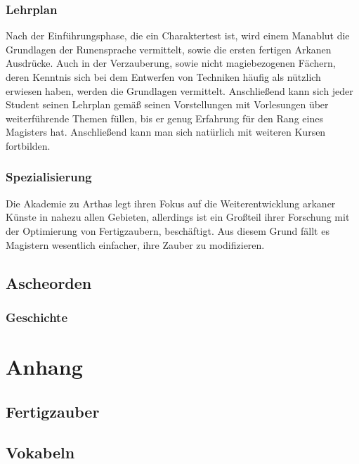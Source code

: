 \documentclass[a4paper,12pt,oneside]{book}
\begin{document}
\section{Lehrplan}
Nach der Einführungsphase, die ein Charaktertest ist, wird einem Manablut die Grundlagen der Runensprache vermittelt, sowie die ersten fertigen Arkanen Ausdrücke. Auch in der Verzauberung, sowie nicht magiebezogenen Fächern, deren Kenntnis sich bei dem Entwerfen von Techniken häufig als nützlich erwiesen haben, werden die Grundlagen vermittelt. Anschließend kann sich jeder Student seinen Lehrplan gemäß seinen Vorstellungen mit Vorlesungen über weiterführende Themen füllen, bis er genug Erfahrung für den Rang eines Magisters hat. Anschließend kann man sich natürlich mit weiteren Kursen fortbilden.

\section{Spezialisierung}
Die Akademie zu Arthas legt ihren Fokus auf die Weiterentwicklung arkaner Künste in nahezu allen Gebieten, allerdings ist ein Großteil ihrer Forschung mit der Optimierung von Fertigzaubern, beschäftigt. Aus diesem Grund fällt es Magistern wesentlich einfacher, ihre Zauber zu modifizieren.

\chapter{Ascheorden}

\section{Geschichte}

\part{Anhang}

\chapter{Fertigzauber}

\chapter{Vokabeln}
\end{document}
